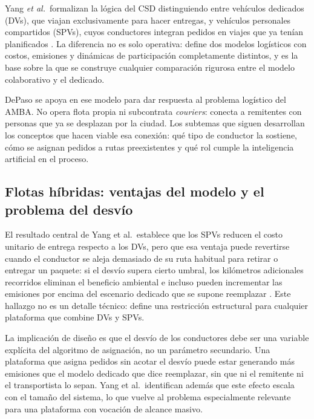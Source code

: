 Yang \textit{et al.}\ formalizan la lógica del CSD distinguiendo entre vehículos dedicados (DVs), que viajan exclusivamente para hacer entregas, y vehículos personales compartidos (SPVs), cuyos conductores integran pedidos en viajes que ya tenían planificados \parencite{YangEtAl2022}. La diferencia no es solo operativa: define dos modelos logísticos con costos, emisiones y dinámicas de participación completamente distintos, y es la base sobre la que se construye cualquier comparación rigurosa entre el modelo colaborativo y el dedicado.

DePaso se apoya en ese modelo para dar respuesta al problema logístico del AMBA. No opera flota propia ni subcontrata \emph{couriers}: conecta a remitentes con personas que ya se desplazan por la ciudad. Los subtemas que siguen desarrollan los conceptos que hacen viable esa conexión: qué tipo de conductor la sostiene, cómo se asignan pedidos a rutas preexistentes y qué rol cumple la inteligencia artificial en el proceso.

\subsection{Flotas híbridas: ventajas del modelo y el problema del desvío}

El resultado central de Yang et al.\ establece que los SPVs reducen el costo unitario de entrega respecto a los DVs, pero que esa ventaja puede revertirse cuando el conductor se aleja demasiado de su ruta habitual para retirar o entregar un paquete: si el desvío supera cierto umbral, los kilómetros adicionales recorridos eliminan el beneficio ambiental e incluso pueden incrementar las emisiones por encima del escenario dedicado que se supone reemplazar \parencite{YangEtAl2022}. Este hallazgo no es un detalle técnico: define una restricción estructural para cualquier plataforma que combine DVs y SPVs.

La implicación de diseño es que el desvío de los conductores debe ser una variable explícita del algoritmo de asignación, no un parámetro secundario. Una plataforma que asigna pedidos sin acotar el desvío puede estar generando más emisiones que el modelo dedicado que dice reemplazar, sin que ni el remitente ni el transportista lo sepan. Yang et al.\ identifican además que este efecto escala con el tamaño del sistema, lo que vuelve al problema especialmente relevante para una plataforma con vocación de alcance masivo.

